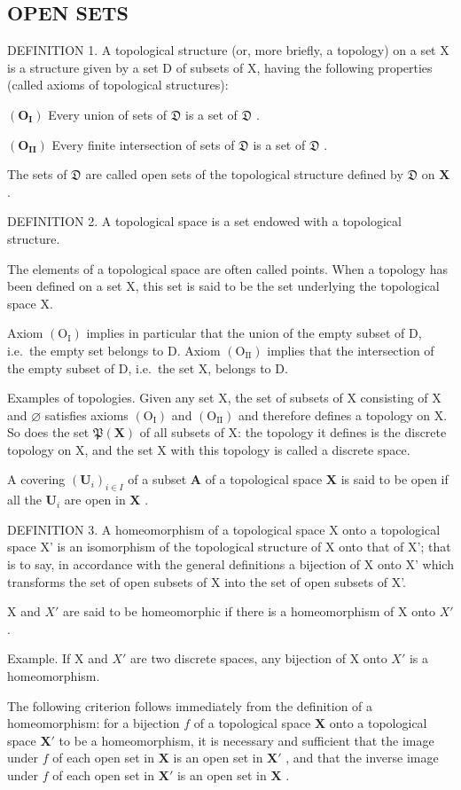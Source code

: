 \subsection{OPEN SETS}

DEFINITION 1. A topological structure (or, more briefly, a topology) on a set X is a structure given by a set D of subsets of X, having the following properties (called axioms of topological structures):

\((\mathbf{O}_{\mathbf{I}})\) Every union of sets of \(\mathfrak{D}\) is a set of \(\mathfrak{D}\) .

\((\mathbf{O}_{\mathbf{II}})\) Every finite intersection of sets of \(\mathfrak{D}\) is a set of \(\mathfrak{D}\) .

The sets of \(\mathfrak{D}\) are called open sets of the topological structure defined by \(\mathfrak{D}\) on \(\mathbf{X}\) .

DEFINITION 2. A topological space is a set endowed with a topological structure.

The elements of a topological space are often called points. When a topology has been defined on a set X, this set is said to be the set underlying the topological space X.

Axiom \((\mathrm{O}_{\mathrm{I}})\) implies in particular that the union of the empty subset of D, i.e.~the empty set belongs to D. Axiom \((\mathrm{O}_{\mathrm{II}})\) implies that the intersection of the empty subset of D, i.e.~the set X, belongs to D.

Examples of topologies. Given any set X, the set of subsets of X consisting of X and \(\varnothing\) satisfies axioms \((\mathrm{O}_{\mathrm{I}})\) and \((\mathrm{O}_{\mathrm{II}})\) and therefore defines a topology on X. So does the set \(\mathfrak{P}(\mathbf{X})\) of all subsets of X: the topology it defines is the discrete topology on X, and the set X with this topology is called a discrete space.

A covering \((\mathbf{U}_i)_{i\in I}\) of a subset \(\mathbf{A}\) of a topological space \(\mathbf{X}\) is said to be open if all the \(\mathbf{U}_i\) are open in \(\mathbf{X}\) .

DEFINITION 3. A homeomorphism of a topological space X onto a topological space X' is an isomorphism of the topological structure of X onto that of X'; that is to say, in accordance with the general definitions a bijection of X onto X' which transforms the set of open subsets of X into the set of open subsets of X'.

X and \(X'\) are said to be homeomorphic if there is a homeomorphism of X onto \(X'\) .

Example. If X and \(X'\) are two discrete spaces, any bijection of X onto \(X'\) is a homeomorphism.

The following criterion follows immediately from the definition of a homeomorphism: for a bijection \(f\) of a topological space \(\mathbf{X}\) onto a topological space \(\mathbf{X}'\) to be a homeomorphism, it is necessary and sufficient that the image under \(f\) of each open set in \(\mathbf{X}\) is an open set in \(\mathbf{X}'\) , and that the inverse image under \(f\) of each open set in \(\mathbf{X}'\) is an open set in \(\mathbf{X}\) .

